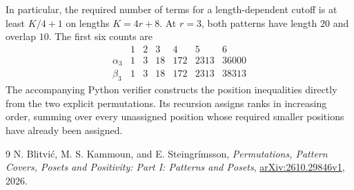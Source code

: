 \documentclass[11pt]{amsart}
\begin{document}
In particular, the required number of terms for a length-dependent cutoff is at least $K/4+1$ on lengths $K=4r+8$. At $r=3$, both patterns have length $20$ and overlap $10$. The first six counts are
\[
\begin{array}{c|rrrrrr}
 &1&2&3&4&5&6\\\hline
\alpha_3 &1&3&18&172&2313&36000\\
\beta_3  &1&3&18&172&2313&38313
\end{array}
\]
The accompanying Python verifier constructs the position inequalities directly from the two explicit permutations. Its recursion assigns ranks in increasing order, summing over every unassigned position whose required smaller positions have already been assigned.

\begin{thebibliography}{9}
 N. Blitvi\'c, M. S. Kammoun, and E. Steingr\'imsson, \emph{Permutations, Pattern Covers, Posets and Positivity: Part I: Patterns and Posets}, \href{https://arxiv.org/abs/2610.29846v1}{arXiv:2610.29846v1}, 2026.
\end{thebibliography}
\end{document}
